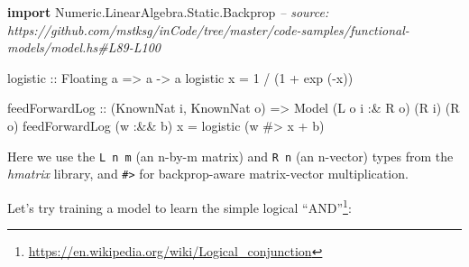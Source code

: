 \documentclass[]{article}
\newenvironment{Shaded}{}{}
\newcommand{\CommentTok}[1]{\textcolor[rgb]{0.38,0.63,0.69}{\textit{#1}}}
\newcommand{\DataTypeTok}[1]{\textcolor[rgb]{0.56,0.13,0.00}{#1}}
\newcommand{\DecValTok}[1]{\textcolor[rgb]{0.25,0.63,0.44}{#1}}
\newcommand{\FunctionTok}[1]{\textcolor[rgb]{0.02,0.16,0.49}{#1}}
\newcommand{\KeywordTok}[1]{\textcolor[rgb]{0.00,0.44,0.13}{\textbf{#1}}}
\newcommand{\NormalTok}[1]{#1}
\newcommand{\OtherTok}[1]{\textcolor[rgb]{0.00,0.44,0.13}{#1}}
\renewcommand{\href}[2]{#2\footnote{\url{#1}}}
\begin{document}
\begin{Shaded}
\begin{Highlighting}[]
\KeywordTok{import} \DataTypeTok{Numeric.LinearAlgebra.Static.Backprop}
\CommentTok{-- source: https://github.com/mstksg/inCode/tree/master/code-samples/functional-models/model.hs#L89-L100}

\OtherTok{logistic ::} \DataTypeTok{Floating}\NormalTok{ a }\OtherTok{=>}\NormalTok{ a }\OtherTok{->}\NormalTok{ a}
\NormalTok{logistic x }\FunctionTok{=} \DecValTok{1} \FunctionTok{/}\NormalTok{ (}\DecValTok{1} \FunctionTok{+}\NormalTok{ exp (}\FunctionTok{-}\NormalTok{x))}

\NormalTok{feedForwardLog}
\OtherTok{    ::}\NormalTok{ (}\DataTypeTok{KnownNat}\NormalTok{ i, }\DataTypeTok{KnownNat}\NormalTok{ o)}
    \OtherTok{=>} \DataTypeTok{Model}\NormalTok{ (}\DataTypeTok{L}\NormalTok{ o i }\FunctionTok{:&} \DataTypeTok{R}\NormalTok{ o) (}\DataTypeTok{R}\NormalTok{ i) (}\DataTypeTok{R}\NormalTok{ o)}
\NormalTok{feedForwardLog (w }\FunctionTok{:&&}\NormalTok{ b) x }\FunctionTok{=}\NormalTok{ logistic (w }\FunctionTok{#>}\NormalTok{ x }\FunctionTok{+}\NormalTok{ b)}
\end{Highlighting}
\end{Shaded}

Here we use the \texttt{L\ n\ m} (an n-by-m matrix) and \texttt{R\ n} (an
n-vector) types from the \emph{hmatrix} library, and \texttt{\#\textgreater{}}
for backprop-aware matrix-vector multiplication.

Let's try training a model to learn the simple
\href{https://en.wikipedia.org/wiki/Logical_conjunction}{logical ``AND''}:

\begin{Shaded}
\end{Shaded}
\end{document}
